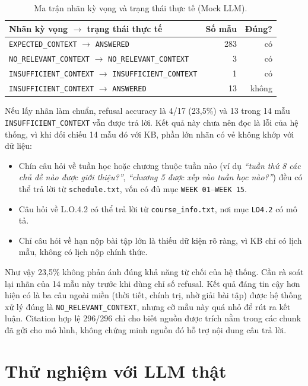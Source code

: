 \begin{table}[H]
\centering
\small
\begin{tabular}{@{}lrr@{}}
\toprule
Nhãn kỳ vọng $\rightarrow$ trạng thái thực tế & Số mẫu & Đúng? \\
\midrule
\texttt{EXPECTED\_CONTEXT} $\rightarrow$ \texttt{ANSWERED} & 283 & có \\
\texttt{NO\_RELEVANT\_CONTEXT} $\rightarrow$ \texttt{NO\_RELEVANT\_CONTEXT} & 3 & có \\
\texttt{INSUFFICIENT\_CONTEXT} $\rightarrow$ \texttt{INSUFFICIENT\_CONTEXT} & 1 & có \\
\texttt{INSUFFICIENT\_CONTEXT} $\rightarrow$ \texttt{ANSWERED} & 13 & không \\
\bottomrule
\end{tabular}
\caption{Ma trận nhãn kỳ vọng và trạng thái thực tế (Mock LLM).}
\end{table}

Nếu lấy nhãn làm chuẩn, refusal accuracy là 4/17 (23,5\%) và 13 trong 14 mẫu \texttt{INSUFFICIENT\_CONTEXT} vẫn được trả lời. Kết quả này chưa nên đọc là lỗi của hệ thống, vì khi đối chiếu 14 mẫu đó với KB, phần lớn nhãn có vẻ không khớp với dữ liệu:

\begin{itemize}
  \item Chín câu hỏi về tuần học hoặc chương thuộc tuần nào (ví dụ \emph{``tuần thứ 8 các chủ đề nào được giới thiệu?''}, \emph{``chương 5 được xếp vào tuần học nào?''}) đều có thể trả lời từ \texttt{schedule.txt}, vốn có đủ mục \texttt{WEEK 01}--\texttt{WEEK 15}.
  \item Câu hỏi về L.O.4.2 có thể trả lời từ \texttt{course\_info.txt}, nơi mục \texttt{LO4.2} có mô tả.
  \item Chỉ câu hỏi về hạn nộp bài tập lớn là thiếu dữ kiện rõ ràng, vì KB chỉ có lịch mẫu, không có lịch nộp chính thức.
\end{itemize}

Như vậy 23,5\% không phản ánh đúng khả năng từ chối của hệ thống. Cần rà soát lại nhãn của 14 mẫu này trước khi dùng chỉ số refusal. Kết quả đáng tin cậy hơn hiện có là ba câu ngoài miền (thời tiết, chính trị, nhờ giải bài tập) được hệ thống xử lý đúng là \texttt{NO\_RELEVANT\_CONTEXT}, nhưng cỡ mẫu này quá nhỏ để rút ra kết luận. Citation hợp lệ 296/296 chỉ cho biết nguồn được trích nằm trong các chunk đã gửi cho mô hình, không chứng minh nguồn đó hỗ trợ nội dung câu trả lời.

\section{Thử nghiệm với LLM thật}


